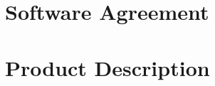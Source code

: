 \documentclass{book}
\begin{document}
\agreement

\chapter{Software Agreement}


\appendix

\chapter{Product Description}









\backmatter
\end{document}
